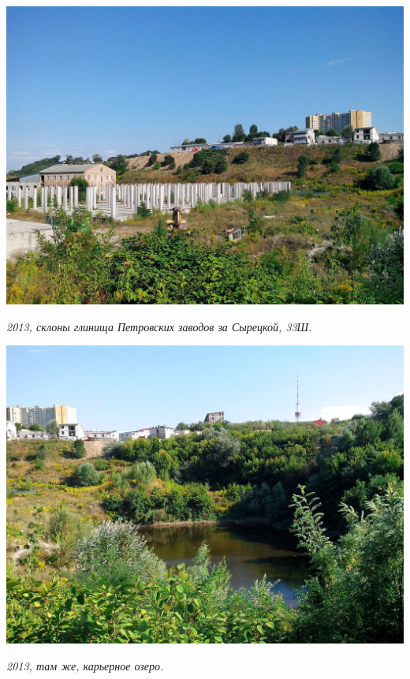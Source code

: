 \begin{center}
\includegraphics[width=\linewidth]{pix/s-syrec-IMG_20130812_163717.jpg}

\textit{2013, склоны глинища Петровских заводов за Сырецкой, 33Ш.}
\end{center} 
\vspace*{\fill}
\newpage

\begin{center}
\includegraphics[width=\linewidth]{pix/s-syrec-IMG_20130812_163712.jpg}

\textit{2013, там же, карьерное озеро.}
\end{center} 

